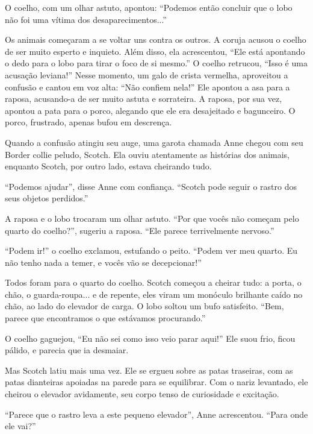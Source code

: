 O coelho, com um olhar astuto, apontou: ``Podemos então concluir que o lobo não foi uma vítima dos desaparecimentos...''

Os animais começaram a se voltar uns contra os outros. A coruja acusou o coelho de ser muito esperto e inquieto. Além disso, ela acrescentou, ``Ele está apontando o dedo para o lobo para tirar o foco de si mesmo.'' O coelho retrucou, ``Isso é uma acusação leviana!'' Nesse momento, um galo de crista vermelha, aproveitou a confusão e cantou em voz alta: ``Não confiem nela!'' Ele apontou a asa para a raposa, acusando-a de ser muito astuta e sorrateira. A raposa, por sua vez, apontou a pata para o porco, alegando que ele era desajeitado e bagunceiro. O porco, frustrado, apenas bufou em descrença.

Quando a confusão atingiu seu auge, uma garota chamada Anne chegou com seu Border collie peludo, Scotch. Ela ouviu atentamente as histórias dos animais, enquanto Scotch, por outro lado, estava cheirando tudo.

``Podemos ajudar'', disse Anne com confiança. ``Scotch pode seguir o rastro dos seus objetos perdidos.''

A raposa e o lobo trocaram um olhar astuto. ``Por que vocês não começam pelo quarto do coelho?'', sugeriu a raposa. ``Ele parece terrivelmente nervoso.''

``Podem ir!'' o coelho exclamou, estufando o peito. ``Podem ver meu quarto. Eu não tenho nada a temer, e vocês vão se decepcionar!''

Todos foram para o quarto do coelho. Scotch começou a cheirar tudo: a porta, o chão, o guarda-roupa... e de repente, eles viram um monóculo brilhante caído no chão, ao lado do elevador de carga. O lobo soltou um bufo satisfeito. ``Bem, parece que encontramos o que estávamos procurando.''

\clearpage



O coelho gaguejou, ``Eu não sei como isso veio parar aqui!'' Ele suou frio, ficou pálido, e parecia que ia desmaiar.

Mas Scotch latiu mais uma vez. Ele se ergueu sobre as patas traseiras, com as patas dianteiras apoiadas na parede para se equilibrar. Com o nariz levantado, ele cheirou o elevador avidamente, seu corpo tenso de curiosidade e excitação.

``Parece que o rastro leva a este pequeno elevador'', Anne acrescentou. ``Para onde ele vai?''


